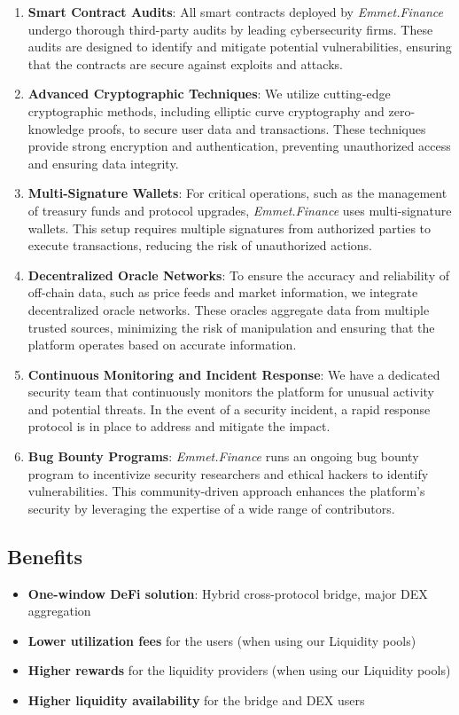 \documentclass[12pt, a4paper]{article}
\begin{document}
\begin{enumerate}
    \item \textbf{Smart Contract Audits}: All smart contracts deployed by \textit{Emmet.Finance} undergo thorough third-party audits by leading cybersecurity firms. These audits are designed to identify and mitigate potential vulnerabilities, ensuring that the contracts are secure against exploits and attacks.
    \item \textbf{Advanced Cryptographic Techniques}: We utilize cutting-edge cryptographic methods, including elliptic curve cryptography and zero-knowledge proofs, to secure user data and transactions. These techniques provide strong encryption and authentication, preventing unauthorized access and ensuring data integrity.
    \item \textbf{Multi-Signature Wallets}: For critical operations, such as the management of treasury funds and protocol upgrades, \textit{Emmet.Finance} uses multi-signature wallets. This setup requires multiple signatures from authorized parties to execute transactions, reducing the risk of unauthorized actions. 
    \item \textbf{Decentralized Oracle Networks}: To ensure the accuracy and reliability of off-chain data, such as price feeds and market information, we integrate decentralized oracle networks. These oracles aggregate data from multiple trusted sources, minimizing the risk of manipulation and ensuring that the platform operates based on accurate information. 
    \item \textbf{Continuous Monitoring and Incident Response}: We have a dedicated security team that continuously monitors the platform for unusual activity and potential threats. In the event of a security incident, a rapid response protocol is in place to address and mitigate the impact.
    \item \textbf{Bug Bounty Programs}: \textit{Emmet.Finance} runs an ongoing bug bounty program to incentivize security researchers and ethical hackers to identify vulnerabilities. This community-driven approach enhances the platform's security by leveraging the expertise of a wide range of contributors.
\end{enumerate}

\subsection{Benefits} 
    \begin{itemize}
        \item \textbf{One-window DeFi solution}: Hybrid cross-protocol bridge, major DEX aggregation
        \item \textbf{Lower utilization fees} for the users (when using our Liquidity pools)
        \item \textbf{Higher rewards} for the liquidity providers (when using our Liquidity pools)
        \item \textbf{Higher liquidity availability} for the bridge and DEX users
    \end{itemize}
    
\end{document}
